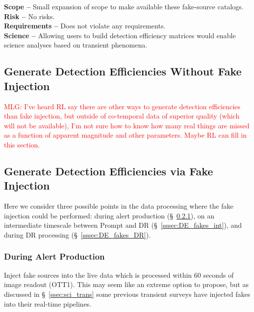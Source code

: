 \documentclass[DM,lsstdraft,toc]{lsstdoc}
\begin{document}
{\bf Scope --} Small expansion of scope to make available these fake-source catalogs. \\
{\bf Risk --} No risks. \\
{\bf Requirements --} Does not violate any requirements. \\
{\bf Science --} Allowing users to build detection efficiency matrices would enable science analyses based on transient phenomena.

\subsection{Generate Detection Efficiencies Without Fake Injection}\label{ssec:DE_nofakes}

\textcolor{red}{MLG: I've heard RL say there are other ways to generate detection efficiencies than fake injection, but outside of co-temporal data of superior quality (which will not be available), I'm not sure how to know how many real things are missed as a function of apparent magnitude and other parameters. Maybe RL can fill in this section.}

 
\subsection{Generate Detection Efficiencies via Fake Injection}\label{ssec:DE_fakes}

Here we consider three possible points in the data processing where the fake injection could be performed: during alert production (\S~\ref{sssec:DE_fakes_AP}), on an intermediate timescale between Prompt and DR (\S~\ref{sssec:DE_fakes_int}), and during DR processing (\S~\ref{sssec:DE_fakes_DR}).

\subsubsection{During Alert Production}\label{sssec:DE_fakes_AP}

Inject fake sources into the live data which is processed within 60 seconds of image readout (OTT1). This may seem like an extreme option to propose, but as discussed in \S~\ref{ssec:sci_trans} some previous transient surveys have injected fakes into their real-time pipelines.
\end{document}
